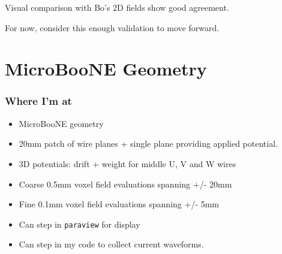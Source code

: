 \documentclass[xcolor=dvipsnames]{beamer}
\begin{document}
\begin{frame}
  \begin{center}
    Visual comparison with Bo's 2D fields show good agreement.

    For now, consider this enough validation to move forward.
  \end{center}
\end{frame}

\section{MicroBooNE Geometry}

\begin{frame}
  \frametitle{Where I'm at}
  \begin{itemize}
  \item MicroBooNE geometry
  \item 20mm patch of wire planes + single plane providing applied potential.
  \item 3D potentials: drift + weight for middle U, V and W wires
  \item Coarse 0.5mm voxel field evaluations spanning +/- 20mm
  \item Fine 0.1mm voxel field evaluations spanning +/- 5mm
  \item Can step in \texttt{paraview} for display
  \item Can step in my code to collect current waveforms.
  \end{itemize}
\end{frame}
\end{document}
